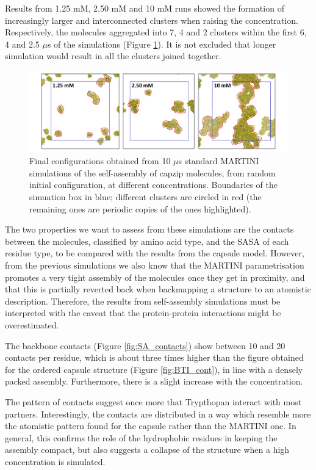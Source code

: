 Results from 1.25 mM, 2.50 mM and 10 mM runs showed the formation of increasingly larger and interconnected clusters when raising the concentration. Respectively, the molecules aggregated into 7, 4 and 2 clusters within the first 6, 4 and 2.5 $\mu$s of the simulations (Figure \ref{fig:SA_final}). It is not excluded that longer simulation would result in all the clusters joined together.
%
\begin{figure}[t!]
\centering\includegraphics[width=0.95\linewidth]{3results_capsule/pics/final_SA.png} 
\caption[Self-assembly simulations, final configurations]{Final configurations obtained from 10 $\mu$s standard MARTINI simulations of the self-assembly of capzip molecules, from random initial configuration, at different concentrations. Boundaries of the simuation box in blue; different clusters are circled in red (the remaining ones are periodic copies of the ones highlighted).}
\label{fig:SA_final}
\end{figure}

The two properties we want to assess from these simulations are the contacts between the molecules, classified by amino acid type, and the SASA of each residue type, to be compared with the results from the capsule model. However, from the previous simulations we also know that the MARTINI parametrisation promotes a very tight assembly of the molecules once they get in proximity, and that this is partially reverted back when backmapping a structure to an atomistic description. Therefore, the results from self-assembly simulations must be interpreted with the caveat that the protein-protein interactions might be overestimated.

The backbone contacts (Figure \ref{fig:SA_contacts}) show between 10 and 20 contacts per residue, which is about three times higher than the figure obtained for the ordered capsule structure (Figure \ref{fig:BTI_cont}), in line with a densely packed assembly.
%
Furthermore, there is a slight increase with the concentration.

The pattern of contacts suggest once more that Trypthopan interact with most partners. Interestingly, the contacts are distributed in a way which resemble more the atomistic pattern found for the capsule rather than the MARTINI one. In general, this confirms the role of the hydrophobic residues in keeping the assembly compact, but also suggests a collapse of the structure when a high concentration is simulated.

